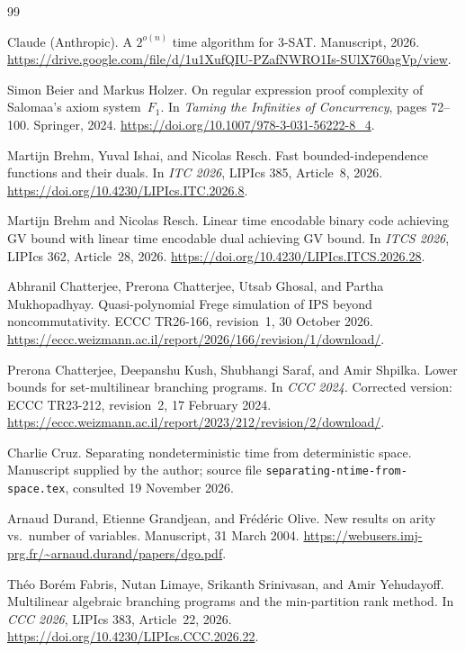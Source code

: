 \documentclass[11pt]{article}
\theoremstyle{definition}
\theoremstyle{remark}
\begin{document}
\begin{thebibliography}{99}

 Claude (Anthropic).
\newblock A $2^{o(n)}$ time algorithm for 3-SAT.
\newblock Manuscript, 2026.
\newblock \url{https://drive.google.com/file/d/1u1XufQIU-PZafNWRO1Is-SUlX760agVp/view}.

 Simon Beier and Markus Holzer.
\newblock On regular expression proof complexity of Salomaa's axiom
system~$F_1$.
\newblock In \emph{Taming the Infinities of Concurrency}, pages 72--100.
Springer, 2024.
\newblock \url{https://doi.org/10.1007/978-3-031-56222-8_4}.

 Martijn Brehm, Yuval Ishai, and Nicolas Resch.
\newblock Fast bounded-independence functions and their duals.
\newblock In \emph{ITC 2026}, LIPIcs 385, Article~8, 2026.
\newblock \url{https://doi.org/10.4230/LIPIcs.ITC.2026.8}.

 Martijn Brehm and Nicolas Resch.
\newblock Linear time encodable binary code achieving GV bound with
linear time encodable dual achieving GV bound.
\newblock In \emph{ITCS 2026}, LIPIcs 362, Article~28, 2026.
\newblock \url{https://doi.org/10.4230/LIPIcs.ITCS.2026.28}.

 Abhranil Chatterjee, Prerona Chatterjee,
Utsab Ghosal, and Partha Mukhopadhyay.
\newblock Quasi-polynomial Frege simulation of IPS beyond
noncommutativity.
\newblock ECCC TR26-166, revision~1, 30 October 2026.
\newblock \url{https://eccc.weizmann.ac.il/report/2026/166/revision/1/download/}.

 Prerona Chatterjee, Deepanshu Kush, Shubhangi Saraf,
and Amir Shpilka.
\newblock Lower bounds for set-multilinear branching programs.
\newblock In \emph{CCC 2024}. Corrected version: ECCC TR23-212,
revision~2, 17 February 2024.
\newblock \url{https://eccc.weizmann.ac.il/report/2023/212/revision/2/download/}.

 Charlie Cruz.
\newblock Separating nondeterministic time from deterministic space.
\newblock Manuscript supplied by the author; source file
\texttt{separating-ntime-from-space.tex}, consulted 19 November 2026.

 Arnaud Durand, Etienne Grandjean, and Fr\'ed\'eric Olive.
\newblock New results on arity vs.\ number of variables.
\newblock Manuscript, 31 March 2004.
\newblock \url{https://webusers.imj-prg.fr/~arnaud.durand/papers/dgo.pdf}.

 Th\'eo Bor\'em Fabris, Nutan Limaye,
Srikanth Srinivasan, and Amir Yehudayoff.
\newblock Multilinear algebraic branching programs and the
min-partition rank method.
\newblock In \emph{CCC 2026}, LIPIcs 383, Article~22, 2026.
\newblock \url{https://doi.org/10.4230/LIPIcs.CCC.2026.22}.


\end{thebibliography}
\end{document}
